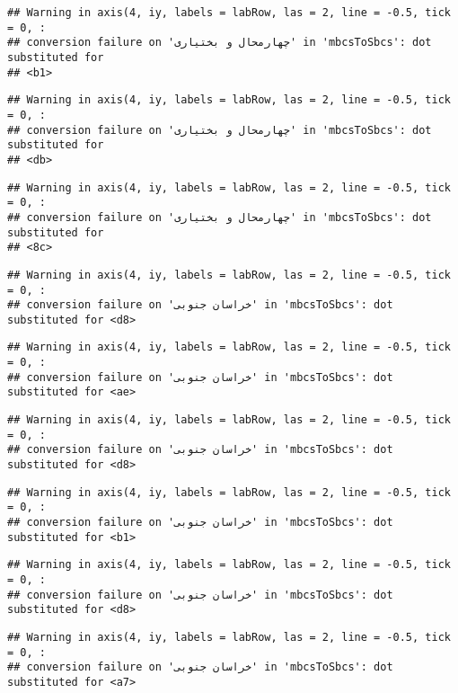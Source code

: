 \documentclass[
]{article}
\begin{document}
\begin{verbatim}
## Warning in axis(4, iy, labels = labRow, las = 2, line = -0.5, tick = 0, :
## conversion failure on 'چهارمحال و بختیاری' in 'mbcsToSbcs': dot substituted for
## <b1>
\end{verbatim}

\begin{verbatim}
## Warning in axis(4, iy, labels = labRow, las = 2, line = -0.5, tick = 0, :
## conversion failure on 'چهارمحال و بختیاری' in 'mbcsToSbcs': dot substituted for
## <db>
\end{verbatim}

\begin{verbatim}
## Warning in axis(4, iy, labels = labRow, las = 2, line = -0.5, tick = 0, :
## conversion failure on 'چهارمحال و بختیاری' in 'mbcsToSbcs': dot substituted for
## <8c>
\end{verbatim}

\begin{verbatim}
## Warning in axis(4, iy, labels = labRow, las = 2, line = -0.5, tick = 0, :
## conversion failure on 'خراسان جنوبی' in 'mbcsToSbcs': dot substituted for <d8>
\end{verbatim}

\begin{verbatim}
## Warning in axis(4, iy, labels = labRow, las = 2, line = -0.5, tick = 0, :
## conversion failure on 'خراسان جنوبی' in 'mbcsToSbcs': dot substituted for <ae>
\end{verbatim}

\begin{verbatim}
## Warning in axis(4, iy, labels = labRow, las = 2, line = -0.5, tick = 0, :
## conversion failure on 'خراسان جنوبی' in 'mbcsToSbcs': dot substituted for <d8>
\end{verbatim}

\begin{verbatim}
## Warning in axis(4, iy, labels = labRow, las = 2, line = -0.5, tick = 0, :
## conversion failure on 'خراسان جنوبی' in 'mbcsToSbcs': dot substituted for <b1>
\end{verbatim}

\begin{verbatim}
## Warning in axis(4, iy, labels = labRow, las = 2, line = -0.5, tick = 0, :
## conversion failure on 'خراسان جنوبی' in 'mbcsToSbcs': dot substituted for <d8>
\end{verbatim}

\begin{verbatim}
## Warning in axis(4, iy, labels = labRow, las = 2, line = -0.5, tick = 0, :
## conversion failure on 'خراسان جنوبی' in 'mbcsToSbcs': dot substituted for <a7>
\end{verbatim}
\end{document}
